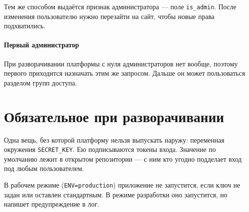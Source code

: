 Тем же способом выдаётся признак администратора --- поле \texttt{is\_admin}. После изменения пользователю нужно перезайти на сайт, чтобы новые права подхватились.

\paragraph{Первый администратор}
При разворачивании платформы с нуля администраторов нет вообще, поэтому первого приходится назначать этим же запросом. Дальше он может пользоваться разделом групп доступа.

\section{Обязательное при разворачивании}
\label{sec:admin:deploy}

Одна вещь, без которой платформу нельзя выпускать наружу: переменная окружения \texttt{SECRET\_KEY}. Ею подписываются токены входа. Значение по умолчанию лежит в открытом репозитории --- с ним кто угодно подделает вход под любым пользователем.

В рабочем режиме (\texttt{ENV=production}) приложение не запустится, если ключ не задан или оставлен стандартным. В режиме разработки оно запустится, но напишет предупреждение в лог.

